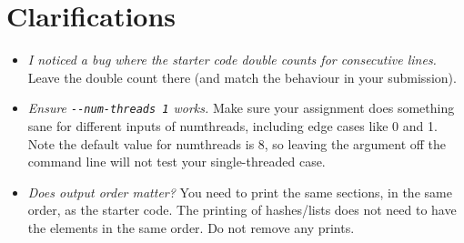 \documentclass[12pt]{article}
\renewcommand{\_}{\kern-1.5pt\textunderscore\kern-1.5pt}
\begin{document}
\section*{Clarifications}

\begin{itemize}
  \item \emph{I noticed a bug where the starter code double counts for consecutive lines.} Leave the double count there (and match the behaviour in your submission).
  \item \emph{Ensure \texttt{-{}-num-threads 1} works.} Make sure your assignment does something sane for different inputs of num\_threads, including edge cases like 0 and 1. Note the default value for num\_threads is 8, so leaving the argument off the command line will not test your single-threaded case.
  \item \emph{Does output order matter?} You need to print the same sections, in the same order, as the starter code. The printing of hashes/lists does not need to have the elements in the same order. Do not remove any prints.
\end{itemize}  



\end{document}
